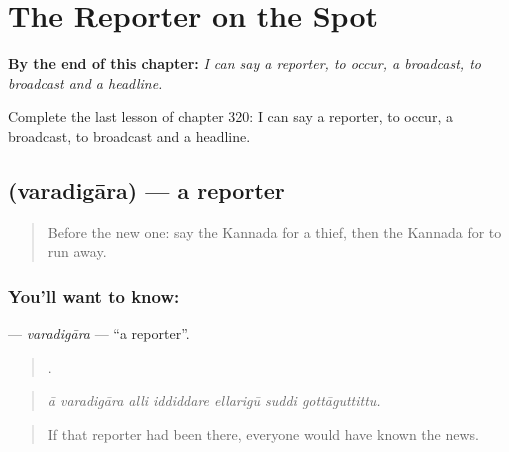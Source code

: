 
\chapter{The Reporter on the Spot}
\label{ch:ka-the-reporter-on-the-spot}

\begin{chapteropening}
\textbf{By the end of this chapter:} \emph{I can say a reporter, to occur, a broadcast, to broadcast and a headline.}

Complete the last lesson of chapter 320: I can say a reporter, to occur, a broadcast, to broadcast and a headline.
\end{chapteropening}

\section[\texorpdfstring{\kn{ವರದಿಗಾರ} (varadigāra)}{ವರದಿಗಾರ (varadigāra)}]{ (varadigāra) — a reporter}

\label{lesson:KA-C320-varadigara}



\begin{quote}
Before the new one: say the Kannada for a thief, then the Kannada for to run away.
\end{quote}

\subsection*{You'll want to know: }
\textbf{} — \emph{varadigāra} — \textquotedblleft{}a reporter\textquotedblright{}.

\begin{quote}
      .
\end{quote}

\begin{quote}
\emph{ā varadigāra alli iddiddare ellarigū suddi gottāguttittu.}
\end{quote}

\begin{quote}
If that reporter had been there, everyone would have known the news.
\end{quote}

